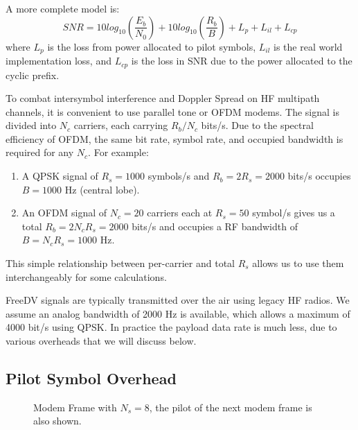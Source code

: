 \documentclass{article}
\begin{document}
A more complete model is:
\begin{equation}
\label{eq:snr_all}
SNR = 10log_{10}\left(\frac{E_b}{N_0}\right) + 10log_{10}\left(\frac{R_b}{B}\right) + L_p + L_{il} + L_{cp}
\end{equation}
where $L_p$ is the loss from power allocated to pilot symbols, $L_{il}$ is the real world implementation loss, and $L_{cp}$ is the loss in SNR due to the power allocated to the cyclic prefix.

To combat intersymbol interference and Doppler Spread on HF multipath channels, it is convenient to use parallel tone or OFDM modems. The signal is divided into $N_c$ carriers, each carrying $R_b/N_c$ bits/s.  Due to the spectral efficiency of OFDM, the same bit rate, symbol rate, and occupied bandwidth is required for any $N_c$.  For example:
\begin{enumerate}
\item A QPSK signal of $R_s=1000$ symbols/s and $R_b=2R_s=2000$ bits/s occupies $B=1000$ Hz (central lobe).
\item An OFDM signal of $N_c=20$ carriers each at $R_s=50$ symbol/s gives us a total $R_b=2N_cR_s=2000$ bits/s and occupies a RF bandwidth of $B=N_cR_s=1000$ Hz.
\end{enumerate}
This simple relationship between per-carrier and total $R_s$ allows us to use them interchangeably for some calculations.
 
FreeDV signals are typically transmitted over the air using legacy HF radios.  We assume an analog bandwidth of 2000 Hz is available, which allows a maximum of 4000 bit/s using QPSK.  In practice the payload data rate is much less, due to various overheads that we will discuss below.

\subsection{Pilot Symbol Overhead}

\begin{figure}[h]
\caption{Modem Frame with $N_s=8$, the pilot of the next modem frame is also shown.}
\vspace{5mm}
\label{fig:modem_frame}
\centering
{}
\end{figure}
\end{document}
